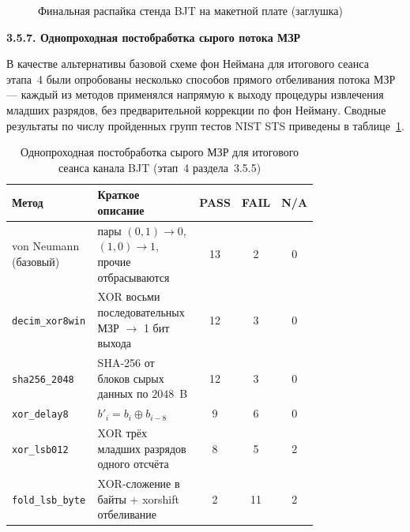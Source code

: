 \begin{figure}[htbp]
  \centering
  \caption{Финальная распайка стенда BJT на макетной плате (заглушка)}
  \label{fig:bjt_pcb_photo}
\end{figure}

\textbf{3.5.7. Однопроходная постобработка сырого потока МЗР}

В качестве альтернативы базовой схеме фон Неймана для итогового сеанса этапа~4 были
опробованы несколько способов прямого отбеливания потока МЗР --- каждый из методов
применялся напрямую к выходу процедуры извлечения младших разрядов, без
предварительной коррекции по фон Нейману. Сводные результаты по числу пройденных
групп тестов NIST STS приведены в таблице~\ref{tab:bjt_postproc_compare}.

\begin{table}[htbp]
  \centering
  \footnotesize
  \caption{Однопроходная постобработка сырого МЗР для итогового сеанса канала BJT
  (этап~4 раздела~3.5.5)}
  \label{tab:bjt_postproc_compare}
  \begin{tabular}{|p{0.32\linewidth}|p{0.45\linewidth}|c|c|c|}
    \hline
    Метод & Краткое описание & PASS & FAIL & N/A \\
    \hline
    von Neumann (базовый) & пары $(0,1)\!\to\! 0$, $(1,0)\!\to\! 1$, прочие отбрасываются & 13 & 2 & 0 \\
    \hline
    \texttt{decim\_xor8win} & XOR восьми последовательных МЗР $\to$ 1 бит выхода & 12 & 3 & 0 \\
    \hline
    \texttt{sha256\_2048} & SHA-256 от блоков сырых данных по $2048$~B & 12 & 3 & 0 \\
    \hline
    \texttt{xor\_delay8} & $b'_i = b_i \oplus b_{i-8}$ & 9 & 6 & 0 \\
    \hline
    \texttt{xor\_lsb012} & XOR трёх младших разрядов одного отсчёта & 8 & 5 & 2 \\
    \hline
    \texttt{fold\_lsb\_byte} & XOR-сложение в байты + xorshift отбеливание & 2 & 11 & 2 \\
    \hline
  \end{tabular}
\end{table}

